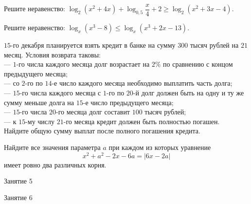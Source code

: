 \begin{homework}[number=2]
\begin{listofex}
\begin{tasks}
		\end{tasks}
		\item Решите неравенство: \( \log_2(x^2+4x)+\log_{0,5}\dfrac{x}{4}+2\ge\log_2(x^2+3x-4)\).
		\item Решите неравенство: \( \log_x(x^3-8)\le\log_x(x^3+2x-13) \).
		\item \( 15 \)-го декабря планируется взять кредит в банке на сумму \( 300 \) тысяч рублей на \( 21 \) месяц. Условия возврата таковы:\\		
		--- \( 1 \)-го числа каждого месяца долг возрастает на \( 2\% \) по сравнению с концом предыдущего месяца;\\
		--- со \( 2 \)-го по \( 14 \)-е число каждого месяца необходимо выплатить часть долга;\\
		--- \( 15 \)-го числа каждого месяца с \( 1 \)-го по \( 20 \)-й долг должен быть на одну и ту же сумму меньше долга на \( 15 \)-е число предыдущего месяца;\\		
		--- \( 15 \)-го числа \( 20 \)-го месяца долг составит \( 100 \) тысяч рублей;\\
		--- к \( 15 \)-му числу \( 21 \)-го месяца кредит должен быть полностью погашен.\\
		Найдите общую сумму выплат после полного погашения кредита.
		\item Найдите все значения параметра \( a \) при каждом из которых уравнение
		\[x^2+a^2-2x-6a=|6x-2a|\]
		имеет ровно два различных корня.
	\end{listofex}
\end{homework}

\begin{class}[number=5]
	\begin{listofex}
		\item Занятие 5
	\end{listofex}
\end{class}

\begin{class}[number=6]
	\begin{listofex}
		\item Занятие 6
	\end{listofex}
\end{class}

